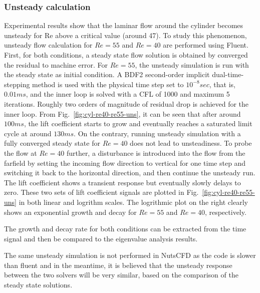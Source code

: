 \documentclass[journal,final]{new-aiaa}
\begin{document}
\subsubsection{Unsteady calculation}
Experimental results show that the laminar flow around the cylinder
becomes unsteady for Re above a critical value (around 47). To study
this phenomenon, unsteady flow calculation for $Re=55$ and $Re=40$
are performed using Fluent. First, for both conditions, a steady
state flow solution is obtained by converged the residual to machine error.
For $Re=55$, the unsteady simulation is run with the steady state
as initial condition. A BDF2 second-order implicit dual-time-stepping
method is used with the physical time step set to $10^{-8} sec$, that is, $0.01 ms$,
and
the inner loop is solved with a CFL of 1000 and maximum 5 iterations.
Roughly two orders of magnitude of residual drop is achieved for the
inner loop. From Fig.~\ref{fig:cyl-re40-re55-uns}, it can be seen
that after around $100 ms$, the lift coefficient starts to grow and
eventually reaches a saturated limit cycle at around $130 ms$.
On the contrary, running unsteady simulation with a fully converged
steady state for $Re=40$ does not lead to unsteadiness. To probe
the flow at $Re=40$ further, a disturbance is introduced into the
flow from the farfield by setting the incoming flow direction to vertical
for one time step and switching it back to the horizontal direction,
and then continue the unsteady run. The lift coefficient shows a
transient response but eventually slowly delays to zero. These
two sets of lift coefficient signals are plotted in Fig.~\ref{fig:cyl-re40-re55-uns}
in both linear and logrithm scales. The logrithmic plot on the right
clearly shows an exponential growth and decay for $Re=55$ and $Re=40$,
respectively.

{\color{red} The growth and decay rate for both conditions can be extracted
	from the time signal and then be compared to the eigenvalue analysis
	results.}


{\color{red} The same unsteady simulation is not performed in NutsCFD
	as the code is slower than fluent and in the meantime, it is believed
	that the unsteady response between the two solvers will be very similar,
	based on the comparison of the steady state solutions.}
\end{document}
